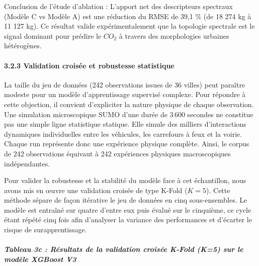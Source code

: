 \documentclass[10pt, a4paper]{article}
\begin{document}
Conclusion de l'étude d'ablation : L'apport net des descripteurs
spectraux (Modèle C vs Modèle A) est une réduction du RMSE de 39,1 \%
(de 18 274 kg à 11 127 kg). Ce résultat valide expérimentalement que la
topologie spectrale est le signal dominant pour prédire le \(CO_2\) à
travers des morphologies urbaines hétérogènes.

\paragraph{3.2.3 Validation croisée et robustesse
statistique}\label{validation-croisuxe9e-et-robustesse-statistique}

La taille du jeu de données (242 observations issues de 36 villes) peut
paraître modeste pour un modèle d'apprentissage supervisé complexe. Pour
répondre à cette objection, il convient d'expliciter la nature physique
de chaque observation. Une simulation microscopique SUMO d'une durée de
3\,600 secondes ne constitue pas une simple ligne statistique statique.
Elle simule des milliers d'interactions dynamiques individuelles entre
les véhicules, les carrefours à feux et la voirie. Chaque run représente
donc une expérience physique complète. Ainsi, le corpus de 242
observations équivaut à 242 expériences physiques macroscopiques
indépendantes.

Pour valider la robustesse et la stabilité du modèle face à cet
échantillon, nous avons mis en œuvre une validation croisée de type
K-Fold (\(K=5\)). Cette méthode sépare de façon itérative le jeu de
données en cinq sous-ensembles. Le modèle est entraîné sur quatre
d'entre eux puis évalué sur le cinquième, ce cycle étant répété cinq
fois afin d'analyser la variance des performances et d'écarter le risque
de surapprentissage.

\subparagraph{Tableau 3c : Résultats de la validation croisée K-Fold
(K=5) sur le modèle XGBoost
V3}\label{tableau-3c-ruxe9sultats-de-la-validation-croisuxe9e-k-fold-k5-sur-le-moduxe8le-xgboost-v3}
\end{document}

